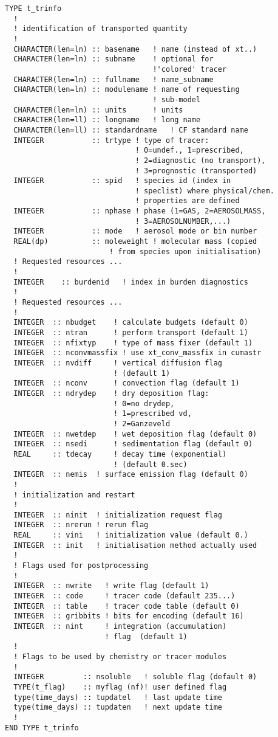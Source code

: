 \begin{lstlisting}[caption={\tt t\_trinfo}]
TYPE t_trinfo
  !
  ! identification of transported quantity
  !
  CHARACTER(len=ln) :: basename   ! name (instead of xt..)
  CHARACTER(len=ln) :: subname    ! optional for 
                                  !'colored' tracer
  CHARACTER(len=ln) :: fullname   ! name_subname
  CHARACTER(len=ln) :: modulename ! name of requesting 
                                  ! sub-model
  CHARACTER(len=ln) :: units      ! units
  CHARACTER(len=ll) :: longname   ! long name
  CHARACTER(len=ll) :: standardname   ! CF standard name
  INTEGER           :: trtype ! type of tracer: 
                              ! 0=undef., 1=prescribed, 
                              ! 2=diagnostic (no transport),
                              ! 3=prognostic (transported)
  INTEGER           :: spid   ! species id (index in 
                              ! speclist) where physical/chem.
                              ! properties are defined 
  INTEGER           :: nphase ! phase (1=GAS, 2=AEROSOLMASS, 
                              ! 3=AEROSOLNUMBER,...)
  INTEGER           :: mode   ! aerosol mode or bin number
  REAL(dp)          :: moleweight ! molecular mass (copied 
                        ! from species upon initialisation)
  ! Requested resources ...
  ! 
  INTEGER    :: burdenid   ! index in burden diagnostics
  !
  ! Requested resources ...
  !
  INTEGER  :: nbudget    ! calculate budgets (default 0)
  INTEGER  :: ntran      ! perform transport (default 1)
  INTEGER  :: nfixtyp    ! type of mass fixer (default 1)
  INTEGER  :: nconvmassfix ! use xt_conv_massfix in cumastr
  INTEGER  :: nvdiff     ! vertical diffusion flag  
                         ! (default 1)
  INTEGER  :: nconv      ! convection flag (default 1)
  INTEGER  :: ndrydep    ! dry deposition flag: 
                         ! 0=no drydep, 
                         ! 1=prescribed vd,
                         ! 2=Ganzeveld 
  INTEGER  :: nwetdep    ! wet deposition flag (default 0)
  INTEGER  :: nsedi      ! sedimentation flag (default 0)
  REAL     :: tdecay     ! decay time (exponential) 
                         ! (default 0.sec)
  INTEGER  :: nemis  ! surface emission flag (default 0)
  !
  ! initialization and restart
  !
  INTEGER  :: ninit  ! initialization request flag
  INTEGER  :: nrerun ! rerun flag
  REAL     :: vini   ! initialization value (default 0.)
  INTEGER  :: init   ! initialisation method actually used 
  !
  ! Flags used for postprocessing
  !
  INTEGER  :: nwrite   ! write flag (default 1)
  INTEGER  :: code     ! tracer code (default 235...)
  INTEGER  :: table    ! tracer code table (default 0)
  INTEGER  :: gribbits ! bits for encoding (default 16)
  INTEGER  :: nint     ! integration (accumulation) 
                       ! flag  (default 1)  
  !
  ! Flags to be used by chemistry or tracer modules
  !
  INTEGER         :: nsoluble   ! soluble flag (default 0)
  TYPE(t_flag)    :: myflag (nf)! user defined flag
  type(time_days) :: tupdatel   ! last update time
  type(time_days) :: tupdaten   ! next update time
  !
END TYPE t_trinfo
\end{lstlisting}
%

